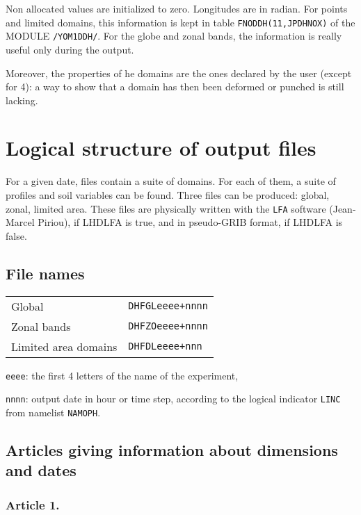 \bigskip

Non allocated values are initialized to zero. Longitudes are in radian. For points and limited domains, this information is kept in table {\tt FNODDH(11,JPDHNOX)} of the MODULE \verb+/YOM1DDH/+. For the globe and zonal bands, the information is really useful only during the output. 

Moreover, the properties of he domains are the ones declared by the user (except for 4): a way to show that a domain has then been deformed or punched is still lacking. 

\section{Logical structure of output files}

For a given date, files contain a suite of domains. For each of them, a suite of
profiles and soil variables can be found. Three files can be produced: global,
zonal, limited area. These files are physically written with the {\tt LFA}
software (Jean-Marcel Piriou), if LHDLFA is true, and in pseudo-GRIB format, if
LHDLFA is false.
\ms

\subsection{File names }

\begin{tabular}{ll}
 Global & {\tt DHFGLeeee+nnnn} \\
 Zonal bands & {\tt DHFZOeeee+nnnn} \\
 Limited area domains & {\tt DHFDLeeee+nnn}
\end{tabular}

\begin{description}
	\item{\tt eeee}: the first 4 letters of the name of the experiment,
	\item{\tt nnnn}: output date in hour or time step, according to the logical indicator 
		{\tt LINC} from namelist {\tt NAMOPH}.
\end{description}

\subsection{Articles giving information about dimensions and dates}
\subsubsection*{Article 1.}

